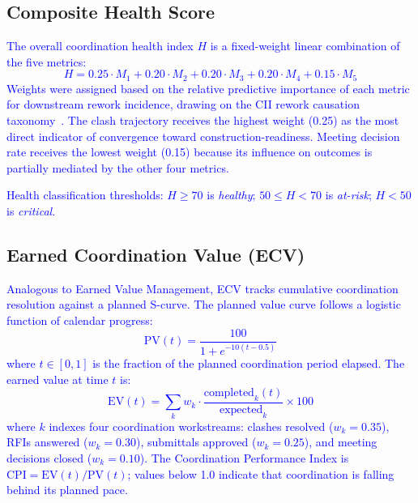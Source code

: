 \documentclass[conference]{IEEEtran}
\newcommand{\placeholder}[1]{\textcolor{blue}{#1}}
\begin{document}
\subsection{Composite Health Score}
\label{sec:composite}
\placeholder{
The overall coordination health index $H$ is a fixed-weight linear combination of the five metrics:
\begin{equation}
    H = 0.25 \cdot M_1 + 0.20 \cdot M_2 + 0.20 \cdot M_3 + 0.20 \cdot M_4 + 0.15 \cdot M_5
    \label{eq:health}
\end{equation}
Weights were assigned based on the relative predictive importance of each metric for downstream rework incidence, drawing on the CII rework causation taxonomy~\cite{cii2005}. The clash trajectory receives the highest weight (0.25) as the most direct indicator of convergence toward construction-readiness. Meeting decision rate receives the lowest weight (0.15) because its influence on outcomes is partially mediated by the other four metrics.

Health classification thresholds: $H \geq 70$ is \textit{healthy}; $50 \leq H < 70$ is \textit{at-risk}; $H < 50$ is \textit{critical}.
}

\subsection{Earned Coordination Value (ECV)}
\placeholder{
Analogous to Earned Value Management, ECV tracks cumulative coordination resolution against a planned S-curve. The planned value curve follows a logistic function of calendar progress:
\begin{equation}
    \text{PV}(t) = \frac{100}{1 + e^{-10(t - 0.5)}}
\end{equation}
where $t \in [0, 1]$ is the fraction of the planned coordination period elapsed. The earned value at time $t$ is:
\begin{equation}
    \text{EV}(t) = \sum_{k} w_k \cdot \frac{\text{completed}_k(t)}{\text{expected}_k} \times 100
\end{equation}
where $k$ indexes four coordination workstreams: clashes resolved ($w_k = 0.35$), RFIs answered ($w_k = 0.30$), submittals approved ($w_k = 0.25$), and meeting decisions closed ($w_k = 0.10$). The Coordination Performance Index is $\text{CPI} = \text{EV}(t) / \text{PV}(t)$; values below 1.0 indicate that coordination is falling behind its planned pace.
}
\end{document}
